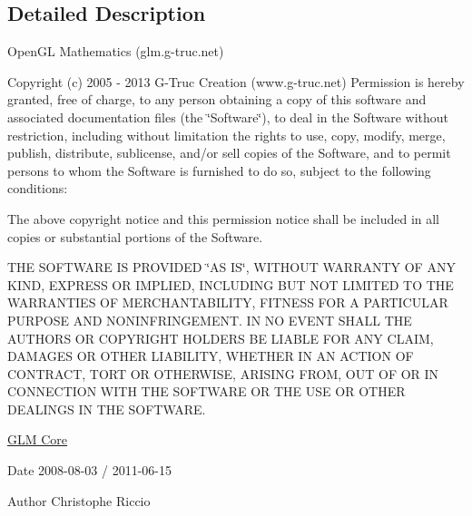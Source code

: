 \subsection{Detailed Description}
Open\+G\+L Mathematics (glm.\+g-\/truc.\+net)

Copyright (c) 2005 -\/ 2013 G-\/\+Truc Creation (www.\+g-\/truc.\+net) Permission is hereby granted, free of charge, to any person obtaining a copy of this software and associated documentation files (the \char`\"{}\+Software\char`\"{}), to deal in the Software without restriction, including without limitation the rights to use, copy, modify, merge, publish, distribute, sublicense, and/or sell copies of the Software, and to permit persons to whom the Software is furnished to do so, subject to the following conditions\+:

The above copyright notice and this permission notice shall be included in all copies or substantial portions of the Software.

T\+H\+E S\+O\+F\+T\+W\+A\+R\+E I\+S P\+R\+O\+V\+I\+D\+E\+D \char`\"{}\+A\+S I\+S\char`\"{}, W\+I\+T\+H\+O\+U\+T W\+A\+R\+R\+A\+N\+T\+Y O\+F A\+N\+Y K\+I\+N\+D, E\+X\+P\+R\+E\+S\+S O\+R I\+M\+P\+L\+I\+E\+D, I\+N\+C\+L\+U\+D\+I\+N\+G B\+U\+T N\+O\+T L\+I\+M\+I\+T\+E\+D T\+O T\+H\+E W\+A\+R\+R\+A\+N\+T\+I\+E\+S O\+F M\+E\+R\+C\+H\+A\+N\+T\+A\+B\+I\+L\+I\+T\+Y, F\+I\+T\+N\+E\+S\+S F\+O\+R A P\+A\+R\+T\+I\+C\+U\+L\+A\+R P\+U\+R\+P\+O\+S\+E A\+N\+D N\+O\+N\+I\+N\+F\+R\+I\+N\+G\+E\+M\+E\+N\+T. I\+N N\+O E\+V\+E\+N\+T S\+H\+A\+L\+L T\+H\+E A\+U\+T\+H\+O\+R\+S O\+R C\+O\+P\+Y\+R\+I\+G\+H\+T H\+O\+L\+D\+E\+R\+S B\+E L\+I\+A\+B\+L\+E F\+O\+R A\+N\+Y C\+L\+A\+I\+M, D\+A\+M\+A\+G\+E\+S O\+R O\+T\+H\+E\+R L\+I\+A\+B\+I\+L\+I\+T\+Y, W\+H\+E\+T\+H\+E\+R I\+N A\+N A\+C\+T\+I\+O\+N O\+F C\+O\+N\+T\+R\+A\+C\+T, T\+O\+R\+T O\+R O\+T\+H\+E\+R\+W\+I\+S\+E, A\+R\+I\+S\+I\+N\+G F\+R\+O\+M, O\+U\+T O\+F O\+R I\+N C\+O\+N\+N\+E\+C\+T\+I\+O\+N W\+I\+T\+H T\+H\+E S\+O\+F\+T\+W\+A\+R\+E O\+R T\+H\+E U\+S\+E O\+R O\+T\+H\+E\+R D\+E\+A\+L\+I\+N\+G\+S I\+N T\+H\+E S\+O\+F\+T\+W\+A\+R\+E.

\hyperlink{group__core}{G\+L\+M Core}

\begin{DoxyDate}{Date}
2008-\/08-\/03 / 2011-\/06-\/15 
\end{DoxyDate}
\begin{DoxyAuthor}{Author}
Christophe Riccio 
\end{DoxyAuthor}
